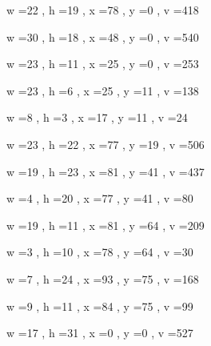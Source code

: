 \documentclass[11pt]{article}
\begin{document}
w =22 , h =19 , x =78 , y =0 , v =418
\par
w =30 , h =18 , x =48 , y =0 , v =540
\par
w =23 , h =11 , x =25 , y =0 , v =253
\par
w =23 , h =6 , x =25 , y =11 , v =138
\par
w =8 , h =3 , x =17 , y =11 , v =24
\par
w =23 , h =22 , x =77 , y =19 , v =506
\par
w =19 , h =23 , x =81 , y =41 , v =437
\par
w =4 , h =20 , x =77 , y =41 , v =80
\par
w =19 , h =11 , x =81 , y =64 , v =209
\par
w =3 , h =10 , x =78 , y =64 , v =30
\par
w =7 , h =24 , x =93 , y =75 , v =168
\par
w =9 , h =11 , x =84 , y =75 , v =99
\par
w =17 , h =31 , x =0 , y =0 , v =527
\par
\newpage
\end{document}
